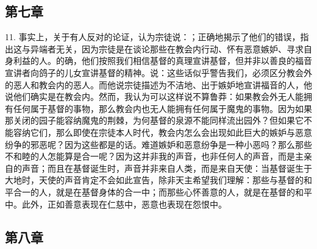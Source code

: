 
\subsection{第七章}

11. 事实上，关于有人反对的论证，认为宗徒说：；正确地揭示了他们的错误，指出这与异端者无关，因为宗徒是在谈论那些在教会内行动、怀有恶意嫉妒、寻求自身利益的人。的确，他们按照我们相信基督的真理宣讲基督，但并非以善良的福音宣讲者向鸽子的儿女宣讲基督的精神。说：这些话似乎警告我们，必须区分教会外的恶人和教会内的恶人。而他说宗徒描述为不洁地、出于嫉妒地宣讲福音的人，他说他们确实是在教会内。然而，我认为可以这样说不算鲁莽：如果教会外无人能拥有任何属于基督的事物，那么教会内也无人能拥有任何属于魔鬼的事物。因为如果那关闭的园子能容纳魔鬼的荆棘，为何基督的泉源不能同样流出园外？但如果它不能容纳它们，那么即使在宗徒本人时代，教会内怎么会出现如此巨大的嫉妒与恶意纷争的邪恶呢？因为这些都是的话。难道嫉妒和恶意纷争是一种小恶吗？那么那些不和睦的人怎能算是合一呢？因为这并非我的声音，也非任何人的声音，而是主亲自的声音；而且在基督诞生时，声音并非来自人类，而是来自天使：当基督诞生于大地时，天使的声音肯定不会如此宣告，除非天主希望我们理解：那些与基督的和平合一的人，就是在基督身体的合一中；而那些心怀善意的人，就是在基督的和平中。此外，正如善意表现在仁慈中，恶意也表现在怨恨中。\par


\subsection{第八章}

